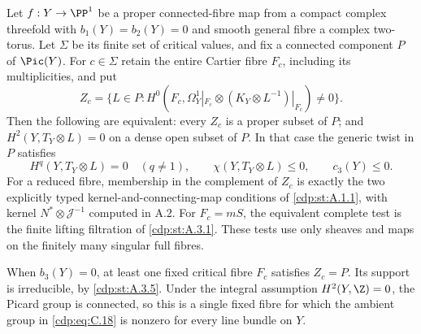 
\begin{proposition}\label{cdp:st:C4c}
Let $f:Y\to\PP^1$ be a proper connected-fibre map from a compact complex threefold with $b_1(Y)=b_2(Y)=0$ and smooth general fibre a complex two-torus. Let $\Sigma$ be its finite set of critical values, and fix a connected component $P$ of $\Pic(Y)$. For $c\in\Sigma$ retain the entire Cartier fibre $F_c$, including its multiplicities, and put
\[
 Z_c=\{L\in P:H^0(F_c,\Omega_Y^1|_{F_c}\otimes
                  (K_Y\otimes L^{-1})|_{F_c})\ne0\}.
                                                               \tag{C.18}\label{cdp:eq:C.18}
\]
Then the following are equivalent: every $Z_c$ is a proper subset of $P$; and $H^2(Y,T_Y\otimes L)=0$ on a dense open subset of $P$. In that case the generic twist in $P$ satisfies
\[
 H^q(Y,T_Y\otimes L)=0\quad(q\ne1),\qquad
 \chi(Y,T_Y\otimes L)\le0,\qquad c_3(Y)\le0.          \tag{C.19}\label{cdp:eq:C.19}
\]
For a reduced fibre, membership in the complement of $Z_c$ is exactly the two explicitly typed kernel-and-connecting-map conditions of \ref{cdp:st:A.1.1}, with kernel $N^*\otimes\mathcal J^{-1}$ computed in A.2. For $F_c=mS$, the equivalent complete test is the finite lifting filtration of \ref{cdp:st:A.3.1}. These tests use only sheaves and maps on the finitely many singular full fibres.

When $b_3(Y)=0$, at least one fixed critical fibre $F_c$ satisfies $Z_c=P$. Its support is irreducible, by \ref{cdp:st:A.3.5}. Under the integral assumption $H^2(Y,\Z)=0$, the Picard group is connected, so this is a single fixed fibre for which the ambient group in \eqref{cdp:eq:C.18} is nonzero for every line bundle on $Y$.
\end{proposition}
